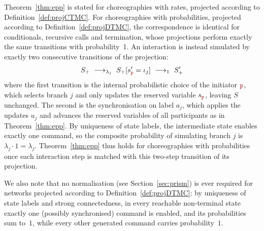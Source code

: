 \begin{rem}\label{rem:dtmc}
  Theorem~\ref{thm:epp} is stated for choreographies with rates,
  projected according to Definition~\ref{def:projCTMC}. For
  choreographies with probabilities, projected according to
  Definition~\ref{def:projDTMC}, the correspondence is identical for
  conditionals, recursive calls and termination, whose projections
  perform exactly the same transitions with probability~1. An
  interaction is instead simulated by exactly two consecutive
  transitions of the projection:
  \[
    S_+ \red{\lambda_j} S_+[s_{\nr}'=\iota_j] \red{1} S_+'
  \]
  where the first transition is the internal probabilistic choice of
  the initiator $\nr$, which selects branch $j$ and only updates the
  reserved variable $s_{\nr}$, leaving $S$ unchanged.  The second is
  the synchronisation on label $a_j$, which applies the updates $u_j$
  and advances the reserved variables of all participants as in
  Theorem~\ref{thm:epp}. By uniqueness of state labels, the
  intermediate state enables exactly one command, so the composite
  probability of simulating branch $j$ is
  $\lambda_j\cdot 1=\lambda_j$. Theorem~\ref{thm:epp} thus holds for
  choreographies with probabilities once each interaction step is
  matched with this two-step transition of its projection.

  We also note that no normalisation (see Section~\ref{sec:prism}) is ever
  required for networks projected according to
  Definition~\ref{def:projDTMC}: by uniqueness of state labels and
  strong connectedness, in every reachable non-terminal state exactly
  one (possibly synchronised) command is enabled, and its
  probabilities sum to~$1$,
  while every other generated command carries probability~$1$.
\end{rem}

